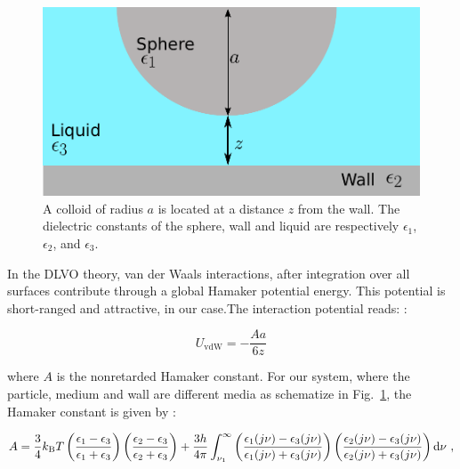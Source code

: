 \begin{figure}[h]
	\centering
	\includegraphics{02_body/chapter3/images/vdw_scheme.pdf}
	\caption{A colloid of radius $a$ is located at a distance $z$ from the wall. The dielectric constants of the sphere, wall and liquid are respectively $\epsilon_1$, $\epsilon_2$, and $\epsilon_3$. }
	\label{Fig:vdw}
\end{figure}

In the DLVO theory, van der Waals interactions, after integration over all surfaces contribute through a global Hamaker potential energy. This potential is short-ranged and attractive, in our case.The interaction potential reads: \cite{israelachvili_intermolecular_2015}:

\begin{equation}
	U_\mathrm{vdW} = -\frac{A a}{6z} 
\end{equation}

where $A$ is the nonretarded Hamaker constant. For our system, where the particle, medium and wall are different media as schematize in Fig.~\ref{Fig:vdw}, the Hamaker constant is given by \cite{israelachvili_intermolecular_2015}:

\begin{equation}
	A = \frac{3}{4} k_\mathrm{B}T \left(
	\frac{\epsilon_1 - \epsilon_3}{\epsilon_1 + \epsilon_3}
	\right)
	\left(
	\frac{\epsilon_2 - \epsilon_3}{\epsilon_2 + \epsilon_3}
	\right)
	+
	\frac{3h}{4\pi}
	\int_{\nu_1}^{\infty}
	\left(
	\frac{\epsilon_1 (j\nu) - \epsilon_3 (j\nu)}{\epsilon_1 (j\nu) + \epsilon_3 (j\nu)}
	\right)
	\left(
	\frac{\epsilon_2 (j\nu) - \epsilon_3 (j\nu)}{\epsilon_2 (j\nu) + \epsilon_3 (j\nu)}
	\right)
	\textnormal{d}\nu ~,
\end{equation}


